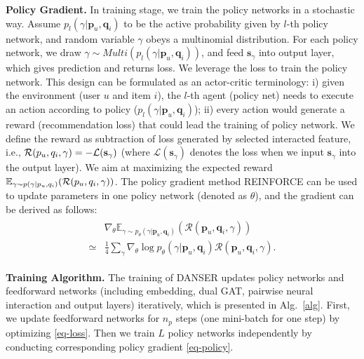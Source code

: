 \documentclass[sigconf]{acmart}
\begin{document}
\textbf{Policy Gradient.} In training stage, we train the policy networks in a stochastic way. Assume $p_l(\gamma|\mathbf p_u, \mathbf q_i)$ to be the active probability given by $l$-th policy network, and random variable $\gamma$ obeys a multinomial distribution. For each policy network, we draw $\gamma\sim Multi(p_l(\gamma|\mathbf p_u, \mathbf q_i))$, and feed $\mathbf s_\gamma$ into output layer, which gives prediction and returns loss. We leverage the loss to train the policy network. This design can be formulated as an actor-critic terminology: i) given the environment (user $u$ and item $i$), the $l$-th agent (policy net) needs to execute an action according to policy ($p_l(\gamma|\mathbf p_u, \mathbf q_i)$); ii) every action would generate a reward (recommendation loss) that could lead the training of policy network. We define the reward as subtraction of loss generated by selected interacted feature, i.e., $\mathcal R(\boldmath p_u, \boldmath q_i, \gamma)=-\mathcal L(\mathbf s_\gamma)$ (where $\mathcal L(\mathbf s_\gamma)$ denotes the loss when we input $\mathbf s_\gamma$ into the output layer). We aim at maximizing the expected reward $\mathbb E_{\gamma\sim p(\gamma|\boldmath p_u, \boldmath q_i)}(\mathcal R(\boldmath p_u, \boldmath q_i, \gamma))$. The policy gradient method REINFORCE \cite{REIN} can be used to update parameters in one policy network (denoted as $\theta$), and the gradient can be derived as follows:
\begin{eqnarray}
\begin{aligned}\label{eq-policy}
&\nabla_\theta \mathbb E_{\gamma\sim p_\theta(\gamma|\mathbf p_u, \mathbf q_i)}(\mathcal R(\mathbf p_u, \mathbf q_i, \gamma))\\
\simeq& \frac{1}{4}\sum\limits_\gamma\nabla_\theta\log p_\theta(\gamma|\mathbf p_u, \mathbf q_i)\mathcal R(\mathbf p_u, \mathbf q_i, \gamma).
\end{aligned}
\end{eqnarray}

\textbf{Training Algorithm.} The training of DANSER updates policy networks and feedforward networks (including embedding, dual GAT, pairwise neural interaction and output layers) iteratively, which is presented in Alg.~\ref{alg}. First, we update feedforward networks for $n_p$ steps (one mini-batch for one step) by optimizing \eqref{eq-loss}. Then we train $L$ policy networks independently by conducting corresponding policy gradient \eqref{eq-policy}.
\end{document}
